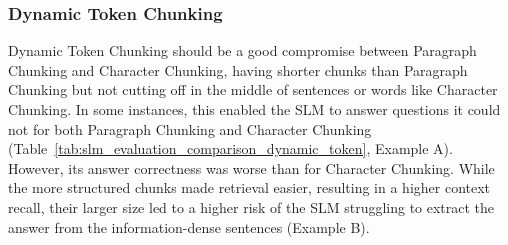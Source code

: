 \documentclass[12pt]{article} %
\begin{document}
\subsubsection{Dynamic Token Chunking}
Dynamic Token Chunking should be a good compromise between Paragraph Chunking and Character Chunking, having shorter chunks than Paragraph Chunking but not cutting off in the middle of sentences or words like Character Chunking. In some instances, this enabled the SLM to answer questions it could not for both Paragraph Chunking and Character Chunking (Table~\ref{tab:slm_evaluation_comparison_dynamic_token}, Example A). However, its answer correctness was worse than for Character Chunking. While the more structured chunks made retrieval easier, resulting in a higher context recall, their larger size led to a higher risk of the SLM struggling to extract the answer from the information-dense sentences (Example B).
\end{document}
